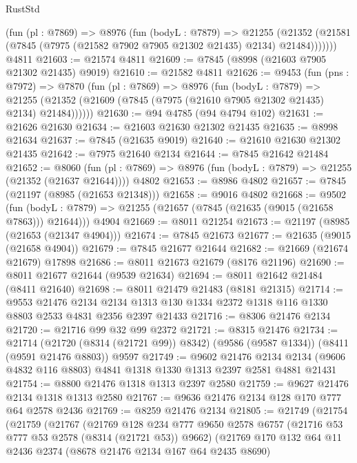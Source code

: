 \begin{lexlean}{RustStd}
\begin{coremodule}
        (fun (pl : @7869) =>
        @8976
          (fun (bodyL : @7879) =>
          @21255
            (@21352 (@21581 (@7845 (@7975 (@21582 @7902 @7905 @21302 @21435) @2134) @21484)))))))
    @4811
@21603 := @21574 @4811
@21609 := @7845 (@8998 (@21603 @7905 @21302 @21435) @9019)
@21610 := @21582 @4811
@21626 := @9453
    (fun (pns : @7972) =>
    @7870
      (fun (pl : @7869) =>
      @8976
        (fun (bodyL : @7879) =>
        @21255 (@21352 (@21609 (@7845 (@7975 (@21610 @7905 @21302 @21435) @2134) @21484))))))
@21630 := @94 @4785 (@94 @4794 @102)
@21631 := @21626 @21630
@21634 := @21603 @21630 @21302 @21435
@21635 := @8998 @21634
@21637 := @7845 (@21635 @9019)
@21640 := @21610 @21630 @21302 @21435
@21642 := @7975 @21640 @2134
@21644 := @7845 @21642 @21484
@21652 := @8060
    (fun (pl : @7869) => @8976 (fun (bodyL : @7879) => @21255 (@21352 (@21637 @21644))))
    @4802
@21653 := @8986 @4802
@21657 := @7845 (@21197 (@8985 (@21653 @21348)))
@21658 := @9016 @4802
@21668 := @9502
    (fun (bodyL : @7879) => @21255 (@21657 (@7845 (@21635 (@9015 (@21658 @7863))) @21644)))
    @4904
@21669 := @8011 @21254
@21673 := @21197 (@8985 (@21653 (@21347 @4904)))
@21674 := @7845 @21673
@21677 := @21635 (@9015 (@21658 @4904))
@21679 := @7845 @21677 @21644
@21682 := @21669 (@21674 @21679) @17898
@21686 := @8011 @21673 @21679 (@8176 @21196)
@21690 := @8011 @21677 @21644 (@9539 @21634)
@21694 := @8011 @21642 @21484 (@8411 @21640)
@21698 := @8011 @21479 @21483 (@8181 @21315)
@21714 := @9553
    @21476
    @2134
    @2134
    @1313
    @130
    @1334
    @2372
    @1318
    @116
    @1330
    @8803
    @2533
    @4831
    @2356
    @2397
    @21433
@21716 := @8306 @21476 @2134
@21720 := @21716 @99 @32 @99 @2372
@21721 := @8315 @21476
@21734 := @21714
    (@21720 (@8314 (@21721 @99)) @8342)
    (@9586 (@9587 @1334))
    (@8411 (@9591 @21476 @8803))
    @9597
@21749 := @9602
    @21476
    @2134
    @2134
    (@9606 @4832 @116 @8803)
    @4841
    @1318
    @1330
    @1313
    @2397
    @2581
    @4881
    @21431
@21754 := @8800 @21476 @1318 @1313 @2397 @2580
@21759 := @9627 @21476 @2134 @1318 @1313 @2580
@21767 := @9636 @21476 @2134 @128 @170 @777 @64 @2578 @2436
@21769 := @8259 @21476 @2134
@21805 := @21749
    (@21754
      (@21759
        (@21767
          (@21769
            @128
            @234
            @777
            @9650
            @2578
            @6757
            (@21716 @53 @777 @53 @2578 (@8314 (@21721 @53)) @9662)
            (@21769
              @170
              @132
              @64
              @11
              @2436
              @2374
              (@8678 @21476 @2134 @167 @64 @2435 @8690)

\end{coremodule}
\end{lexlean}
